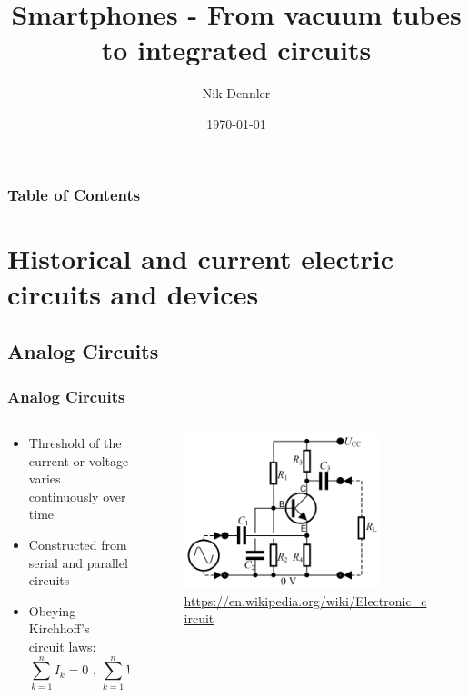 \documentclass{beamer}
\begin{document}
\title{Smartphones - From vacuum tubes to integrated circuits} 
\author{Nik Dennler}
\date{\today} 

\begin{frame}
\titlepage
\end{frame} 

\begin{frame}\frametitle{Table of Contents}\tableofcontents
\end{frame} 


\section{Historical and current electric circuits and devices} 
\subsection{Analog Circuits}
\begin{frame}\frametitle{Analog Circuits} 
\begin{columns}
\begin{column}{6cm}
\begin{itemize}
\item Threshold of the current or voltage varies continuously over time\pause
\item Constructed from serial and parallel circuits \pause
\item Obeying Kirchhoff's circuit laws: 
\begin{equation*}
 \sum_{k=1}^{n} I_{k} = 0 \text{    ,    } \sum_{k=1}^{n} V_{k} = 0
\end{equation*}

\end{itemize}
\end{column}
\begin{column}{6cm}
\begin{figure}
\includegraphics[width=0.8\textwidth]{ampcircuit}
\caption{\url{https://en.wikipedia.org/wiki/Electronic_circuit}}
\end{figure}
\end{column}
\end{columns}
\end{frame}
\end{document}
